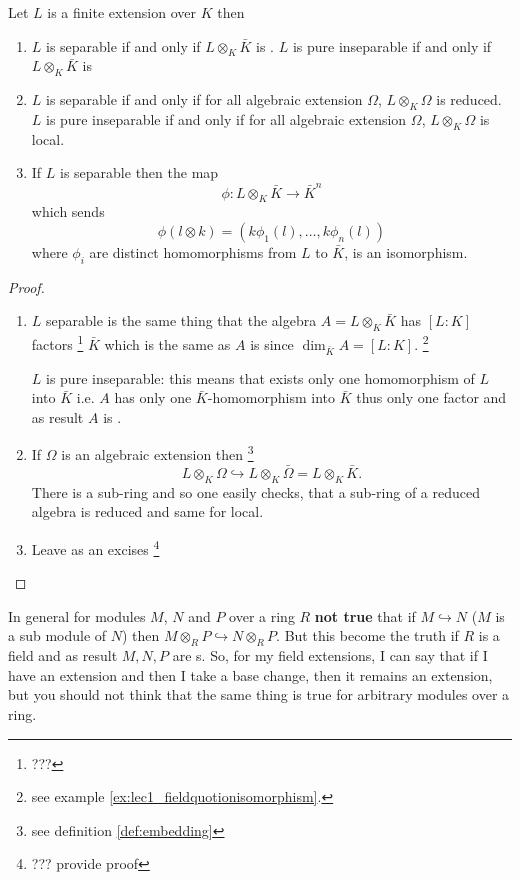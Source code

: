 \begin{theorem}
  Let $L$ is a finite extension over $K$ then
  \begin{enumerate}
  \item $L$ is separable if and only if $L \otimes_K \bar{K}$
    is .
    $L$ is pure inseparable if and only if $L \otimes_K \bar{K}$
    is 
  \item $L$ is separable if and only if for all algebraic extension
    $\Omega$, $L \otimes_K \Omega$ is reduced.
    $L$ is pure inseparable if and only if for all algebraic extension
    $\Omega$, $L \otimes_K \Omega$ is local.
  \item If $L$ is separable then the map
    \[
    \phi: L \otimes_K \bar{K} \to \bar{K}^n
    \]
    which sends
    \[
    \phi\left(l \otimes k\right) =
    \left(
    k \phi_1\left(l\right),
    \dots,
    k \phi_n\left(l\right)
    \right)
    \]
    where $\phi_i$ are distinct homomorphisms from $L$ to $\bar{K}$, 
    is an isomorphism.
  \end{enumerate}
  \begin{proof}
    \begin{enumerate}
    \item $L$ separable is the same thing that the algebra
      $A = L\otimes_K \bar{K}$ has $\left[L:K\right]$ factors
      \footnote{
        ???
      }
      $\bar{K}$ which is the same as $A$ is 
      since $\dim_{\bar{K}} A = \left[L:K\right]$.
      \footnote{
        see example \ref{ex:lec1_fieldquotionisomorphism}.
      }

      $L$ is pure inseparable: this means that exists only one
      homomorphism of $L$ into $\bar{K}$ i.e. $A$ has only one
      $\bar{K}$-homomorphism into $\bar{K}$ thus only one factor and
      as result $A$ is .
    \item If $\Omega$ is an algebraic extension then
      \footnote {
        see definition \ref{def:embedding}
      }
      \[
      L \otimes_K \Omega \hookrightarrow L \otimes_K \bar{\Omega} =
      L \otimes_K \bar{K}.
      \]
      There is a sub-ring and so one easily checks, that a sub-ring of
      a reduced algebra is reduced and same for local.  
    \item Leave as an excises
      \footnote{
        ??? provide proof
      }
    \end{enumerate}
  \end{proof}
  \label{thm:lec5_1}
\end{theorem}
\begin{remark}
In general for modules $M$, $N$ and $P$ over a ring $R$ \textbf{not true} that
if $M \hookrightarrow N$ ($M$ is a sub module of $N$) then
$M \otimes_R P \hookrightarrow N \otimes_R P$. But this become the
truth if $R$ is a field and as result $M,N,P$ are
s. So, for my field extensions, I can say
that if I have an extension and then I take a base change, then it
remains an extension, but  you should not think that the same thing is
true for arbitrary modules over a ring.  
\end{remark}


